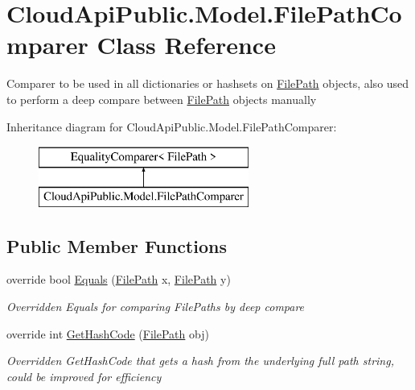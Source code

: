 \hypertarget{class_cloud_api_public_1_1_model_1_1_file_path_comparer}{\section{Cloud\-Api\-Public.\-Model.\-File\-Path\-Comparer Class Reference}
\label{class_cloud_api_public_1_1_model_1_1_file_path_comparer}
}


Comparer to be used in all dictionaries or hashsets on \hyperlink{class_cloud_api_public_1_1_model_1_1_file_path}{File\-Path} objects, also used to perform a deep compare between \hyperlink{class_cloud_api_public_1_1_model_1_1_file_path}{File\-Path} objects manually  


Inheritance diagram for Cloud\-Api\-Public.\-Model.\-File\-Path\-Comparer\-:\begin{figure}[H]
\begin{center}
\leavevmode
\includegraphics[height=2.000000cm]{class_cloud_api_public_1_1_model_1_1_file_path_comparer}
\end{center}
\end{figure}
\subsection*{Public Member Functions}
\begin{DoxyCompactItemize}
\item 
override bool \hyperlink{class_cloud_api_public_1_1_model_1_1_file_path_comparer_a0f01db4ef653ff9e4de84885397f98a4}{Equals} (\hyperlink{class_cloud_api_public_1_1_model_1_1_file_path}{File\-Path} x, \hyperlink{class_cloud_api_public_1_1_model_1_1_file_path}{File\-Path} y)
\begin{DoxyCompactList}\small\item\em Overridden Equals for comparing File\-Paths by deep compare \end{DoxyCompactList}\item 
override int \hyperlink{class_cloud_api_public_1_1_model_1_1_file_path_comparer_a086b67bdaada35cdd4f744130a64cd4c}{Get\-Hash\-Code} (\hyperlink{class_cloud_api_public_1_1_model_1_1_file_path}{File\-Path} obj)
\begin{DoxyCompactList}\small\item\em Overridden Get\-Hash\-Code that gets a hash from the underlying full path string, could be improved for efficiency \end{DoxyCompactList}\end{DoxyCompactItemize}
